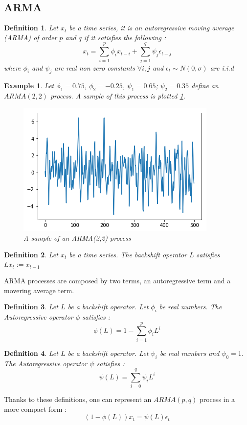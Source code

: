 \documentclass{article}
\newtheorem{ex}{Example}[section]
\newtheorem{Def}{Definition}[section]
\begin{document}
\subsection{ARMA}
\begin{Def}\label{ARMA}
Let $x_t$ be a time series, it is an autoregressive moving average (ARMA) of order $p$ and $q$ if it satisfies the following : 
\begin{equation*}\label{ARMA(p,q)}
x_{t}=\sum_{i=1}^{p}\phi_ix_{t-i}+\sum_{j=1}^{q}\psi_j\epsilon_{t-j} 
\end{equation*}
where $\phi_i$ and $\psi_j$ are real non zero constants $\forall i,j$ and $\epsilon_t\sim N(0,\sigma)$ are i.i.d
\end{Def}
\begin{ex} Let $\phi_1=0.75$, $\phi_2=-0.25$, $\psi_1=0.65$; $\psi_2=0.35$ define an $ARMA(2,2)$ process. A sample of this process is plotted \ref{fig:ARMA(2,2)_sample}. 
\begin{figure}
    \includegraphics[width=\textwidth]{ARMA(2,2).png}
    \caption{A sample of an ARMA(2,2) process}
    \label{fig:ARMA(2,2)_sample}
\end{figure}
\end{ex}
\begin{Def}\label{backshift}
Let $x_t$ be a time series. The backshift operator $L$ satisfies $Lx_t:=x_{t-1}$
\end{Def}
ARMA processes are composed by two terms, an autoregressive term and a movering average term. 
\begin{Def}Let $L$ be a backshift operator. Let $\phi_i$ be real numbers. The Autoregressive operator $\phi$ satisfies : 
\begin{equation*}
    \phi(L)=1-\sum_{i=1}^{p}\phi_i L^{i}
\end{equation*}
\end{Def}
\begin{Def}
Let $L$ be a backshift operator. Let $\psi_i$ be real numbers and $\psi_0=1$. The Autoregressive operator $\psi$ satisfies : 
\begin{equation*}
    \psi(L)=\sum_{i=0}^{q}\psi_i L^{i}
\end{equation*}
\end{Def}
Thanks to these definitions, one can represent an $ARMA(p,q)$ process in a more compact form : 
\begin{equation*}
    (1-\phi(L))x_t=\psi(L)\epsilon_t
\end{equation*}
\end{document}
